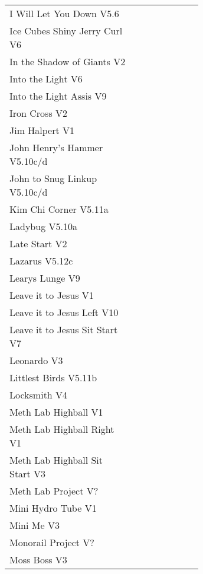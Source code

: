 \begin{flushleft}
\begin{center}
\begin{supertabular}{p{0.65\linewidth}r}
I Will Let You Down V5.6 & \pageref{rt:I Will Let You Down} \\
Ice Cubes Shiny Jerry Curl V6 & \pageref{rt:Ice Cubes Shiny Jerry Curl} \\
In the Shadow of Giants V2 & \pageref{rt:In the Shadow of Giants} \\
Into the Light V6 & \pageref{rt:Into the Light} \\
Into the Light Assis V9 & \pageref{vr:Into the Light Assis} \\
Iron Cross V2 & \pageref{vr:Iron Cross} \\
Jim Halpert V1 & \pageref{rt:Jim Halpert} \\
John Henry's Hammer V5.10c/d & \pageref{rt:John Henry's Hammer} \\
John to Snug Linkup V5.10c/d & \pageref{vr:John to Snug Linkup} \\
Kim Chi Corner V5.11a & \pageref{rt:Kim Chi Corner} \\
Ladybug V5.10a & \pageref{rt:Ladybug} \\
Late Start V2 & \pageref{vr:Late Start} \\
Lazarus V5.12c & \pageref{vr:Lazarus} \\
Learys Lunge V9 & \pageref{vr:Learys Lunge} \\
Leave it to Jesus V1 & \pageref{rt:Leave it to Jesus} \\
Leave it to Jesus Left V10 & \pageref{vr:Leave it to Jesus Left} \\
Leave it to Jesus Sit Start V7 & \pageref{vr:Leave it to Jesus Sit Start} \\
Leonardo V3 & \pageref{rt:Leonardo} \\
Littlest Birds V5.11b & \pageref{rt:Littlest Birds} \\
Locksmith V4 & \pageref{rt:Locksmith} \\
Meth Lab Highball V1 & \pageref{rt:Meth Lab Highball} \\
Meth Lab Highball Right V1 & \pageref{rt:Meth Lab Highball Right} \\
Meth Lab Highball Sit Start V3 & \pageref{vr:Meth Lab Highball Sit Start} \\
Meth Lab Project V? & \pageref{rt:Meth Lab Project} \\
Mini Hydro Tube V1 & \pageref{rt:Mini Hydro Tube} \\
Mini Me V3 & \pageref{rt:Mini Me} \\
Monorail Project V? & \pageref{rt:Monorail Project} \\
Moss Boss V3 & \pageref{rt:Moss Boss} \\

\end{supertabular}
\end{center}
\end{flushleft}
